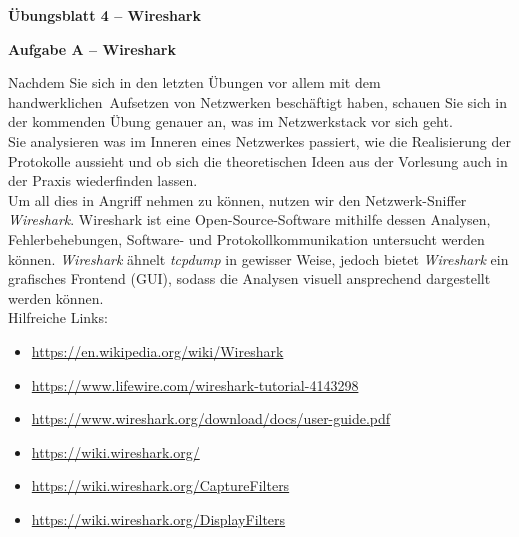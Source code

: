 \documentclass[paper=a4,fontsize=11pt]{scrartcl}%
\numberwithin{equation}{section}
\begin{document}
\begin{center}
\Large{\textbf{Übungsblatt 4 -- Wireshark}}
\end{center}
\begin{center}\Large{\textbf{Aufgabe A -- Wireshark}}\end{center}\vskip0.25in
Nachdem Sie sich in den letzten Übungen vor allem mit dem \glqq handwerklichen\grqq\ Aufsetzen von Netzwerken beschäftigt haben, schauen Sie sich in der kommenden Übung genauer an, was im Netzwerkstack vor sich geht.\\
Sie analysieren was im Inneren eines Netzwerkes passiert, wie die Realisierung der Protokolle aussieht und ob sich die theoretischen Ideen aus der Vorlesung auch in der Praxis wiederfinden lassen.\\
Um all dies in Angriff nehmen zu können, nutzen wir den Netzwerk-Sniffer \emph{Wireshark}. Wireshark ist eine Open-Source-Software mithilfe dessen Analysen, Fehlerbehebungen, Software- und Protokollkommunikation untersucht werden können. \emph{Wireshark} ähnelt \emph{tcpdump} in gewisser Weise, jedoch bietet \emph{Wireshark} ein grafisches Frontend (GUI), sodass die Analysen visuell ansprechend dargestellt werden können.\\
Hilfreiche Links:
\begin{itemize}
	\item \url{https://en.wikipedia.org/wiki/Wireshark}
	\item \url{https://www.lifewire.com/wireshark-tutorial-4143298}
	\item \url{https://www.wireshark.org/download/docs/user-guide.pdf}
	\item \url{https://wiki.wireshark.org/}
	\item \url{https://wiki.wireshark.org/CaptureFilters}
	\item \url{https://wiki.wireshark.org/DisplayFilters}
\end{itemize}
\end{document}

